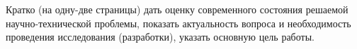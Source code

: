 \chapter*{}

Кратко (на одну-две страницы) дать оценку современного состояния
решаемой научно-технической проблемы, показать актуальность вопроса и
необходимость проведения исследования (разработки), указать основную
цель работы.